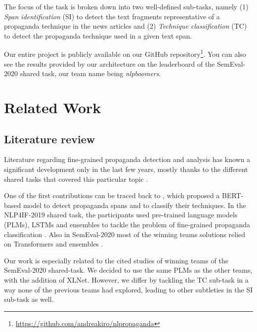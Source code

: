\documentclass[11pt]{article}
\newcommand{\pol}[1]{{\fontfamily{pcr}\selectfont#1}}
\begin{document}
The focus of the task is broken down into two well-defined sub-tasks, namely (1) \textit{Span identification} \pol{(SI)} to detect the text fragments representative of a propaganda technique in the news articles and (2) \textit{Technique classification} \pol{(TC)} to detect the propaganda technique used in a given text span.

Our entire project is publicly available on our GitHub repository\footnote{\url{https://github.com/andreakiro/nlpropaganda}}. You can also see the results provided by our architecture on the leaderboard of the SemEval-2020 shared task, our team name being \textit{nlpboomers}.

\section{Related Work}
\subsection{Literature review}
Literature regarding fine-grained propaganda detection and analysis has known a significant development only in the last few years, mostly thanks to the different shared tasks that covered this particular topic \cite{da-san-martino-etal-2019-findings, finalsemeval}.

One of the first contributions can be traced back to \cite{da-san-martino-etal-2019-fine}, which proposed a \pol{BERT}-based model to detect propaganda spans and to classify their techniques.
In the NLP4IF-2019 shared task, the participants used pre-trained language models (\pol{PLM}s), LSTMs and ensembles to tackle the problem of fine-grained propaganda classification \cite{yoosuf-yang-2019-fine, vlad-etal-2019-sentence, tayyar-madabushi-etal-2019-cost}.
Also in SemEval-2020 most of the winning teams solutions relied on Transformers and ensembles \cite{aschern, morio-etal-2020-hitachi-semeval, dimov2020nopropaganda, jurkiewicz2020applicaai}.

Our work is especially related to the cited studies of winning teams of the SemEval-2020 shared-task. We decided to use the same \pol{PLM}s as the other teams, with the addition of \pol{XLNet}. However, we differ by tackling the \pol{TC} sub-task in a way none of the previous teams had explored, leading to other subtleties in the \pol{SI} sub-task as well.
\end{document}
